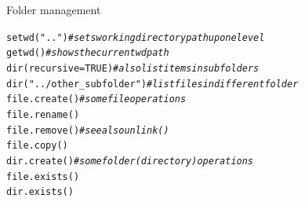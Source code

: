 \documentclass[xcolor=table,           xcolor=dvipsnames]{beamer}\usepackage[]{graphicx}\usepackage[]{color}
\makeatletter
\newcommand{\hlnum}[1]{\textcolor[rgb]{0,0,0}{#1}}
\newcommand{\hlstr}[1]{\textcolor[rgb]{0.545,0.137,0.137}{#1}}
\newcommand{\hlcom}[1]{\textcolor[rgb]{0,0.392,0}{\textit{#1}}}
\newcommand{\hlstd}[1]{\textcolor[rgb]{0,0,0}{#1}}
\newcommand{\hlkwc}[1]{\textcolor[rgb]{1,0,1}{#1}}
\newcommand{\hlkwd}[1]{\textcolor[rgb]{0,0,1}{#1}}
\newenvironment{kframe}{%
 \def\at@end@of@kframe{}%
 \ifinner\ifhmode%
  \def\at@end@of@kframe{\end{minipage}}%
  \begin{minipage}{\columnwidth}%
 \fi\fi%
 \def\FrameCommand##1{\hskip\@totalleftmargin \hskip-\fboxsep
 \colorbox{shadecolor}{##1}\hskip-\fboxsep
     \hskip-\linewidth \hskip-\@totalleftmargin \hskip\columnwidth}%
 \MakeFramed {\advance\hsize-\width
   \@totalleftmargin\z@ \linewidth\hsize
   \@setminipage}}%
 {\par\unskip\endMakeFramed%
 \at@end@of@kframe}
\newenvironment{knitrout}{}{} %
\makeatother
\begin{document}

\begin{frame}[fragile]{Folder management}
\begin{knitrout}
\color{fgcolor}\begin{kframe}
\begin{alltt}
\hlkwd{setwd}\hlstd{(}\hlstr{".."}\hlstd{)} \hlcom{# sets working directory path up one level}
\hlkwd{getwd}\hlstd{()} \hlcom{# shows the current wd path}
\hlkwd{dir}\hlstd{(}\hlkwc{recursive}\hlstd{=}\hlnum{TRUE}\hlstd{)} \hlcom{# also list items in subfolders}
\hlkwd{dir}\hlstd{(}\hlstr{"../other_subfolder"}\hlstd{)} \hlcom{# list files in different folder}
\hlkwd{file.create}\hlstd{()} \hlcom{# some file operations}
\hlkwd{file.rename}\hlstd{()}
\hlkwd{file.remove}\hlstd{()} \hlcom{# see also unlink()}
\hlkwd{file.copy}\hlstd{()}
\hlkwd{dir.create}\hlstd{()} \hlcom{# some folder (directory) operations}
\hlkwd{file.exists}\hlstd{()}
\hlkwd{dir.exists}\hlstd{()}
\end{alltt}
\end{kframe}
\end{knitrout}
\end{frame}

\end{document}
